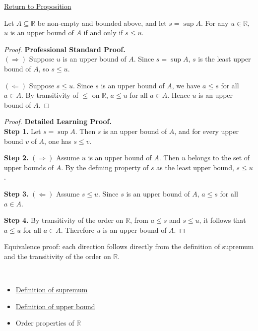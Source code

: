 \newpage
{}
\label{prf:upper-bound-comparison-with-the-supremum}

\begin{remark*}[Return]
\hyperref[prop:upper-bound-comparison-with-the-supremum]{Return to Proposition}
\end{remark*}

\begin{theorem*}
Let $A \subseteq \mathbb{R}$ be non-empty and bounded above, and let $s = \sup A$. For any $u \in \mathbb{R}$, $u$ is an upper bound of $A$ if and only if $s \le u$.
\end{theorem*}

\begin{proof}
\textbf{Professional Standard Proof.}~\\
$(\Rightarrow)$ Suppose $u$ is an upper bound of $A$. Since $s = \sup A$, $s$ is the least upper bound of $A$, so $s \le u$.

$(\Leftarrow)$ Suppose $s \le u$. Since $s$ is an upper bound of $A$, we have $a \le s$ for all $a \in A$. By transitivity of $\le$ on $\mathbb{R}$, $a \le u$ for all $a \in A$. Hence $u$ is an upper bound of $A$.
\end{proof}

\begin{proof}
\textbf{Detailed Learning Proof.}~\\

\textbf{Step 1.} Let $s = \sup A$. Then $s$ is an upper bound of $A$, and for every upper bound $v$ of $A$, one has $s \le v$.

\textbf{Step 2.} $(\Rightarrow)$ Assume $u$ is an upper bound of $A$. Then $u$ belongs to the set of upper bounds of $A$. By the defining property of $s$ as the least upper bound, $s \le u$.

\textbf{Step 3.} $(\Leftarrow)$ Assume $s \le u$. Since $s$ is an upper bound of $A$, $a \le s$ for all $a \in A$.

\textbf{Step 4.} By transitivity of the order on $\mathbb{R}$, from $a \le s$ and $s \le u$, it follows that $a \le u$ for all $a \in A$. Therefore $u$ is an upper bound of $A$.
\end{proof}

\begin{remark*}
Equivalence proof: each direction follows directly from the definition of supremum and the transitivity of the order on $\mathbb{R}$.
\end{remark*}

\begin{remark*}[Dependencies]~\\
\begin{itemize}
  \item \hyperref[def:supremum]{Definition of supremum}
  \item \hyperref[def:upper-bound]{Definition of upper bound}
  \item Order properties of $\mathbb{R}$
\end{itemize}
\end{remark*}
